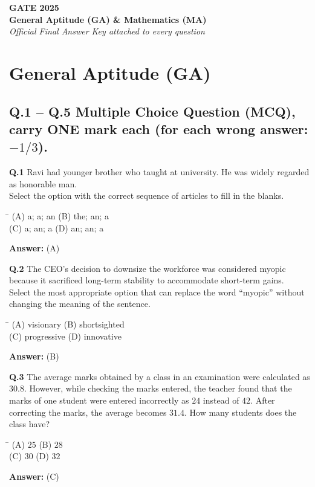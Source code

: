 \documentclass[11pt,a4paper]{article}
\newcommand{\optsfourA}[4]{%
  \begin{tabbing}
    \hspace{0.48\linewidth}\=\kill
    (A) #1 \> (B) #2 \\[2pt]
    (C) #3 \> (D) #4
  \end{tabbing}%
}
\newcommand{\ans}[1]{\textbf{Answer:} #1\par\medskip}
\begin{document}

\begin{center}
  {\LARGE\bfseries GATE 2025}\\[4pt]
  {\large\bfseries General Aptitude (GA) \& Mathematics (MA)}\\[2pt]
  {\small\itshape Official Final Answer Key attached to every question}
\end{center}
\medskip

\section*{General Aptitude (GA)}

\subsection*{Q.1 -- Q.5 Multiple Choice Question (MCQ), carry ONE mark each (for each wrong answer: $-1/3$).}

\textbf{Q.1} Ravi had \underline{\hspace{1.5cm}} younger brother who taught at \underline{\hspace{1.5cm}} university. He was widely regarded as \underline{\hspace{1.5cm}} honorable man.\\
Select the option with the correct sequence of articles to fill in the blanks.
\optsfourA{a; a; an}{the; an; a}{a; an; a}{an; an; a}
\ans{(A)}

\textbf{Q.2} The CEO's decision to downsize the workforce was considered myopic because it sacrificed long-term stability to accommodate short-term gains.\\
Select the most appropriate option that can replace the word ``myopic'' without changing the meaning of the sentence.
\optsfourA{visionary}{shortsighted}{progressive}{innovative}
\ans{(B)}

\textbf{Q.3} The average marks obtained by a class in an examination were calculated as $30.8$. However, while checking the marks entered, the teacher found that the marks of one student were entered incorrectly as $24$ instead of $42$. After correcting the marks, the average becomes $31.4$. How many students does the class have?
\optsfourA{$25$}{$28$}{$30$}{$32$}
\ans{(C)}
\end{document}

